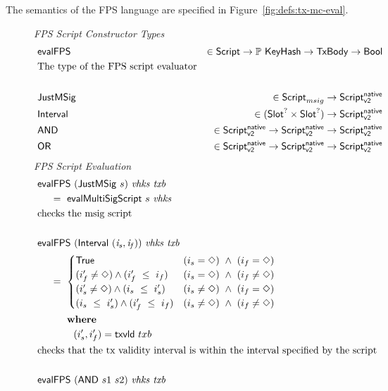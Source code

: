 The semantics of the FPS language are specified in Figure~\ref{fig:defs:tx-mc-eval}.

\begin{figure*}[htb]
  \emph{FPS Script Constructor Types}
  \begin{align*}
    & \mathsf{evalFPS} & \in\mathsf{Script}\to \mathbb{P}~\mathsf{KeyHash}\to\mathsf{TxBody}\to\mathsf{Bool} & \\
    & \text{The type of the FPS script evaluator} \\~\\
    & \mathsf{JustMSig} & \in \mathsf{Script}_{msig} \to \mathsf{Script^{native}_{v2}} & \\
    & \mathsf{Interval} & \in (\mathsf{Slot}^? \times \mathsf{Slot}^?) \to \mathsf{Script^{native}_{v2}} &\\
    & \mathsf{AND} & \in \mathsf{Script^{native}_{v2}} \to \mathsf{Script^{native}_{v2}} \to \mathsf{Script^{native}_{v2}} & \\
    & \mathsf{OR} & \in \mathsf{Script^{native}_{v2}} \to \mathsf{Script^{native}_{v2}} \to \mathsf{Script^{native}_{v2}} & \\
  \end{align*}
  \emph{FPS Script Evaluation}
  \begin{align*}
    & \fun{evalFPS}  ~(\type{JustMSig}~s)~\var{vhks}~\var{txb} \\
    &~~~~ =~ \fun{evalMultiSigScript}~s~\var{vhks} \\
    & \text {checks the msig script}\\~\\
    & \fun{evalFPS} ~(\type{Interval}~\var{(i_s, i_f)})~\var{vhks}~\var{txb} \\
    &~~~~ =~
    \begin{cases}
      \True & (i_s = \Nothing)~\wedge~(i_f = \Nothing) \\
      (i_f' \neq \Nothing) \wedge (i_f'~\leq~i_f) & (i_s = \Nothing)~\wedge~(i_f \neq \Nothing) \\
      (i_s' \neq \Nothing) \wedge (i_s~\leq~i_s') & (i_s \neq \Nothing)~\wedge~(i_f = \Nothing)\\
      (i_s~\leq~i_s') \wedge (i_f'~\leq~i_f) & (i_s \neq \Nothing)~\wedge~(i_f \neq \Nothing)
    \end{cases} \\
    &~~~~~~~ \where \\
    &~~~~~~~~~~~ (i_s', i_f') = \fun{txvld}~{txb} \\
    & \text {checks that the tx validity interval is within the interval specified by the script}\\~\\
    & \fun{evalFPS} ~(\type{AND}~s1~s2)~\var{vhks}~\var{txb}\\

\end{align*}
\end{figure*}

